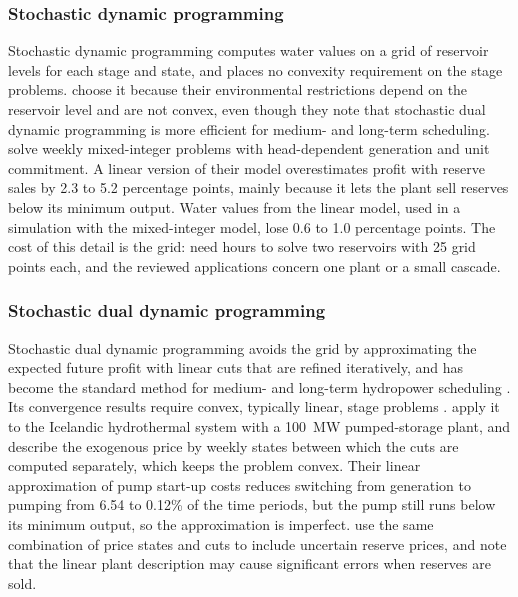 \subsubsection*{Stochastic dynamic programming}

Stochastic dynamic programming computes water values on a grid of
reservoir levels for each stage and state, and places no convexity
requirement on the stage problems. \citet{alic2023optimal} choose it
because their environmental restrictions depend on the reservoir level
and are not convex, even though they note that stochastic dual dynamic
programming is more efficient for medium- and long-term scheduling.
\citet{helseth2017iet} solve weekly mixed-integer problems with
head-dependent generation and unit commitment. A linear version of their
model overestimates profit with reserve sales by 2.3 to 5.2 percentage
points, mainly because it lets the plant sell reserves below its minimum
output. Water values from the linear model, used in a simulation with
the mixed-integer model, lose 0.6 to 1.0 percentage points. The cost of
this detail is the grid: \citet{alic2023optimal} need hours to solve two
reservoirs with 25 grid points each, and the reviewed applications
concern one plant or a small cascade.

\subsubsection*{Stochastic dual dynamic programming}

Stochastic dual dynamic programming \citep{pereira1991} avoids the grid
by approximating the expected future profit with linear cuts that are
refined iteratively, and has become the standard method for medium- and
long-term hydropower scheduling \citep{fullnerRebennack2025}. Its
convergence results require convex, typically linear, stage problems
\citep{shapiro2011}. \citet{helseth2013} apply it to the Icelandic
hydrothermal system with a \SI{100}{\mega\watt} pumped-storage plant,
and describe the exogenous price by weekly states between which the
cuts are computed separately, which keeps the problem convex. Their
linear approximation of pump start-up costs reduces switching from
generation to pumping from 6.54 to 0.12\% of the time periods, but the
pump still runs below its minimum output, so the approximation is
imperfect. \citet{helseth2016} use the same combination of price states
and cuts to include uncertain reserve prices, and note that the linear
plant description may cause significant errors when reserves are sold.

